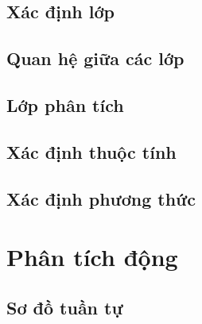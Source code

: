 \documentclass{article}
\begin{document}
  \subsection{Xác định lớp}

  \subsection{Quan hệ giữa các lớp}

  \subsection{Lớp phân tích}

  \subsection{Xác định thuộc tính}

  \subsection{Xác định phương thức}


\section{Phân tích động}

  \subsection{Sơ đồ tuần tự}
\end{document}
